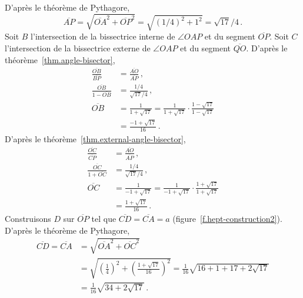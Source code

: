 D'après le théorème de Pythagore,
\[
\overline{AP}=\sqrt{\overline{OA}^2+\overline{OP}^2}=\sqrt{(1/4)^2+1^2}=\sqrt{17}/4\,.
\]
Soit $B$ l'intersection de la bissectrice interne de $\angle OAP$ et du segment  $\overline{OP}$. Soit $C$ l'intersection de la bissectrice externe de $\angle OAP$ et du segment $\overline{QO}$. D'après le théorème~\ref{thm.angle-bisector},
\begin{align*}
\frac{\overline{OB}}{\overline{BP}}&=\frac{\overline{AO}}{\overline{AP}}\,,\\
\frac{\overline{OB}}{1-\overline{OB}}&=\frac{1/4}{\sqrt{17}/{4}}\,,\\
\overline{OB}&=\frac{1}{1+\sqrt{17}}=\frac{1}{1+\sqrt{17}}\cdot \frac{1-\sqrt{17}}{1-\sqrt{17}}\\
&=\frac{-1+\sqrt{17}}{16}\,.
\end{align*}
D'après le théorème~\ref{thm.external-angle-bisector},
\begin{align*}
\frac{\overline{OC}}{\overline{CP}}&=\frac{\overline{AO}}{\overline{AP}}\,,\\
\frac{\overline{OC}}{1+\overline{OC}}&=\frac{1/4}{\sqrt{17}/{4}}\,,\\
\overline{OC}&=\frac{1}{-1+\sqrt{17}}=\frac{1}{-1+\sqrt{17}}\cdot \frac{1+\sqrt{17}}{1+\sqrt{17}}\\
&=\frac{1+\sqrt{17}}{16}\,.
\end{align*}
Construisons $D$ sur $\overline{OP}$ tel que 
 $\overline{CD}=\overline{CA}=a$ (figure~\ref{f.hept-construction2}). D'après le théorème de Pythagore,
\begin{align*}
\overline{CD}=\overline{CA}&=\sqrt{\overline{OA}^2+\overline{OC}^2}\\
&=\sqrt{\left(\frac{1}{4}\right)^2+\left(\frac{1+\sqrt{17}}{16}\right)^2}=\frac{1}{16}\sqrt{16+1+17+2\sqrt{17}}\\
&=\frac{1}{16}\sqrt{34+2\sqrt{17}}\,.
\end{align*}


